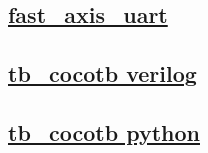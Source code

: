 \documentclass{article}
\begin{document}
  


  \subsection{\href{../files/fast_axis_uart-v.html}{fast\_axis\_uart}}

  \subsection{\href{../files2/tb_cocotb-v.html}{tb\_cocotb verilog}}

  \subsection{\href{../files2/tb_cocotb-py.html}{tb\_cocotb python}}
\end{document}
